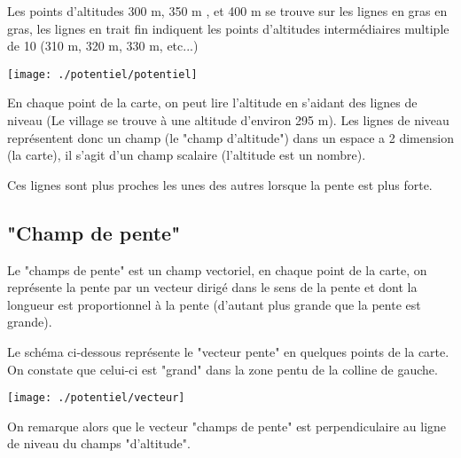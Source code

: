 Les points d'altitudes 300 m, 350 m , et 400 m se trouve sur les lignes en gras en gras, les lignes en trait fin indiquent les points d'altitudes intermédiaires multiple de 10 (310 m, 320 m, 330 m, etc...)

\begin{center}
\texttt{[image: ./potentiel/potentiel]}
\end{center}


En chaque point de la carte, on peut lire l'altitude en s'aidant des lignes de niveau (Le village se trouve à une altitude d'environ 295 m). Les lignes de niveau représentent donc un champ (le "champ d'altitude") dans un espace a 2 dimension (la carte), il s'agit d'un champ scalaire (l'altitude est un nombre).

Ces lignes sont plus proches les unes des autres lorsque la pente est plus forte.


\vfill
\newpage
\subsection{"Champ de pente"}

Le "champs de pente" est un champ vectoriel, en chaque point de la carte, on représente la pente par un vecteur dirigé dans le sens de la pente et dont la longueur est proportionnel à la pente (d'autant plus grande que la pente est grande).

Le schéma ci-dessous représente le "vecteur pente" en quelques points de la carte. On constate que celui-ci est "grand" dans la zone pentu de la colline de gauche.

\begin{center}
\texttt{[image: ./potentiel/vecteur]}
\end{center}

On remarque alors que le vecteur "champs de pente" est perpendiculaire au ligne de niveau du champs "d'altitude".

\vfill
\newpage

